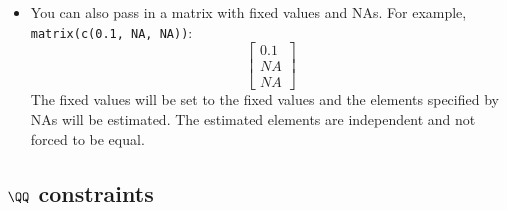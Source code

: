 \begin{itemize}
\item[] You can also pass in a matrix with fixed values and NAs.  For example, \texttt{matrix(c(0.1, NA, NA))}:
\begin{equation*}
 \left[ \begin{array}{c}
    0.1 \\
    NA \\
    NA \end{array} \right]
\end{equation*}
The fixed values will be set to the fixed values and the elements specified by NAs will be estimated.  The estimated elements are independent and not forced to be equal.

\end{itemize}

\subsection{$\QQ$ constraints}

